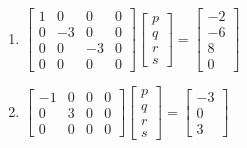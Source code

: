 \begin{exercise}
\begin{enumerate}
\item \(\begin{bmatrix} 1&0&0&0
\\0&-3&0&0
\\0&0&-3&0
\\0&0&0&0 \end{bmatrix}
\begin{bmatrix}p\\q\\r\\s\end{bmatrix}
=\begin{bmatrix} -2
\\-6
\\8
\\0 \end{bmatrix}\)

\item \(\begin{bmatrix} -1&0&0&0
\\0&3&0&0
\\0&0&0&0 \end{bmatrix}
\begin{bmatrix}p\\q\\r\\s\end{bmatrix}
=\begin{bmatrix} -3
\\0
\\3 \end{bmatrix}\)

\end{enumerate}
\end{exercise}





